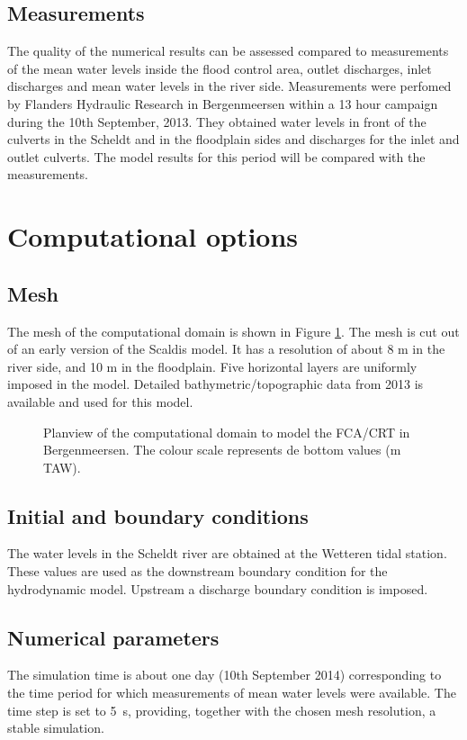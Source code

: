 \subsection{Measurements}
The quality of the numerical results can be assessed compared to measurements of
the mean water levels inside the flood control area,
outlet discharges, inlet discharges and mean water levels in the river side.
Measurements were perfomed by Flanders Hydraulic Research in Bergenmeersen
within a 13 hour campaign during the 10th September, 2013.
They obtained water levels in front of the culverts in the Scheldt
and in the floodplain sides and discharges for the inlet and outlet culverts.
The model results for this period will be compared with the measurements.

\section{Computational options}

\subsection{Mesh}
The mesh of the computational domain is shown in Figure \ref{fig:bergenmeersen_figure4}.
The mesh is cut out of an early version of the Scaldis model.
It has a resolution of about 8 m in the river side, and 10 m in the floodplain.
Five horizontal layers are uniformly imposed in the model.
Detailed bathymetric/topographic data from 2013 is available and used for this model.
\begin{figure}[H]
\begin{center}
\end{center}
\caption{Planview of the computational domain to model the FCA/CRT in Bergenmeersen.
The colour scale represents de bottom values (m TAW).}
\label{fig:bergenmeersen_figure4}
\end{figure}

\subsection{Initial and boundary conditions}
The water levels in the Scheldt river are obtained at the Wetteren tidal station.
These values are used as the downstream boundary condition for the hydrodynamic model.
Upstream a discharge boundary condition is imposed.

\subsection{Numerical parameters}
The simulation time is about one day (10th September 2014) corresponding to the
time period for which measurements of mean water levels were available.
The time step is set to 5~s, providing, together with the chosen mesh
resolution, a stable simulation.

